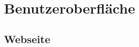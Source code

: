 \documentclass[10pt,a4paper]{article}
\begin{document}





\section{Benutzeroberfl\"ache}
\subsection{Webseite}
\end{document}
